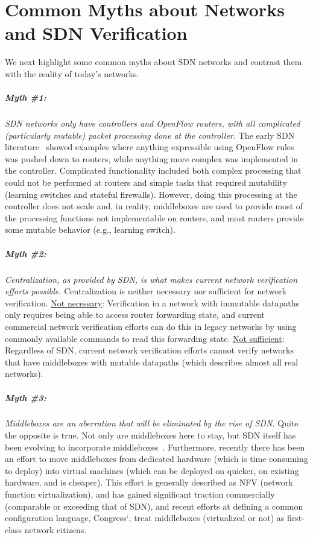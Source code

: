 \section{Common Myths about Networks and SDN Verification}

We next highlight some common myths about SDN networks and contrast them with the reality of today's networks.


\subparagraph*{Myth \#1:} \emph{SDN networks only have controllers and OpenFlow routers, with all complicated (particularly mutable) packet processing done at the controller.} The early SDN literature~\cite{gude2008nox, monsanto2013composing} showed examples where anything expressible using OpenFlow rules was pushed down to routers, while anything more complex was implemented in the controller. Complicated functionality included both complex processing that could not be performed at routers and simple tasks that required mutability (\eg learning switches and stateful firewalls). However, doing this processing at the controller does not scale and, in reality, middleboxes are used to provide most of the processing functions not implementable on routers, and most routers provide some mutable behavior (e.g., learning switch).

\subparagraph*{Myth \#2:} \emph{Centralization, as provided by SDN, is what makes current network verification efforts possible.} Centralization is neither necessary nor sufficient for network verification. {\underline{Not necessary}:} Verification in a network with immutable datapaths only requires being able to access router forwarding state, and current commercial network verification efforts can do this in legacy networks by using commonly available commands to read this forwarding state. {\underline{Not sufficient}:} Regardless of SDN, current network verification efforts cannot verify networks that have middleboxes with mutable datapaths (which describes almost all real networks).

\cbstart
\subparagraph*{Myth \#3:} \emph{Middleboxes are an aberration that will be eliminated by the rise of SDN.} Quite the opposite is true. Not only are middleboxes here to stay, but SDN itself has been evolving to incorporate middleboxes~\cite{scottI2talk}. Furthermore, recently there has been an effort to move middleboxes from dedicated hardware (which is time consuming to deploy) into virtual machines (which can be deployed on quicker, on existing hardware, and is cheaper). This effort is generally described as NFV (network function virtualization), and has gained significant traction commercially (comparable or exceeding that of SDN), and recent efforts at defining a common configuration language, \eg Congress`\cite{congress}, treat middleboxes (virtualized or not) as first-class network citizens.
\cbend

